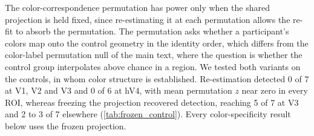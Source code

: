 

The color-correspondence permutation has power only when the shared projection is held fixed, since re-estimating it at each permutation allows the re-fit to absorb the permutation. The permutation asks whether a participant's colors map onto the control geometry in the identity order, which differs from the color-label permutation null of the main text, where the question is whether the control group interpolates above chance in a region. We tested both variants on the controls, in whom color structure is established. Re-estimation detected 0 of 7 at V1, V2 and V3 and 0 of 6 at hV4, with mean permutation $z$ near zero in every ROI, whereas freezing the projection recovered detection, reaching 5 of 7 at V3 and 2 to 3 of 7 elsewhere (\cref{tab:frozen_control}). Every color-specificity result below uses the frozen projection.

